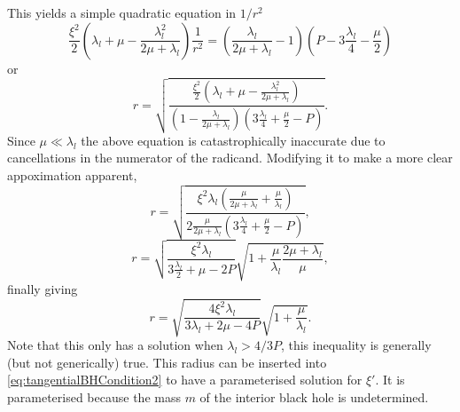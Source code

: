This yields a simple quadratic equation in $1/r^2$
\begin{equation}
\frac{\xi^2}{2}\left(\lambda_l + \mu - \frac{\lambda_l^2}{2\mu + \lambda_l}\right)\frac{1}{r^2} = \left(\frac{\lambda_l}{2\mu + \lambda_l} - 1\right)\left(P - 3\frac{\lambda_l}{4} - \frac{\mu}{2}\right)
\label{eq:quadraticBHRadius2}
\end{equation}
or
\begin{equation}
r = \sqrt{
\frac{\frac{\xi^2}{2}\left(\lambda_l + \mu - \frac{\lambda_l^2}{2\mu + \lambda_l}\right)}{\left(1 - \frac{\lambda_l}{2\mu + \lambda_l}\right)\left(3\frac{\lambda_l}{4} + \frac{\mu}{2} - P\right)}
}.
\label{eq:quadraticBHRadius2}
\end{equation}
Since $\mu\ll\lambda_l$ the above equation is catastrophically inaccurate due to cancellations in the numerator of the radicand. Modifying it to make a more clear appoximation apparent,
\begin{equation}
r = \sqrt{
\frac{\xi^2\lambda_l\left(\frac{\mu}{2\mu + \lambda_l} + \frac{\mu}{\lambda_l}\right)}{2\frac{\mu}{2\mu + \lambda_l}\left(3\frac{\lambda_l}{4} + \frac{\mu}{2} - P\right)}
},
\label{eq:quadraticBHRadius3}
\end{equation}
\begin{equation}
r = \sqrt{\frac{\xi^2\lambda_l}{3\frac{\lambda_l}{2} + \mu - 2P}}\sqrt{1 + \frac{\mu}{\lambda_l}\frac{2\mu + \lambda_l}{\mu}},
\label{eq:quadraticBHRadius4}
\end{equation}
finally giving
\begin{equation}
r = \sqrt{\frac{4\xi^2\lambda_l}{3\lambda_l + 2\mu - 4P}}\sqrt{1 + \frac{\mu}{\lambda_l}}.
\label{eq:quadraticBHRadius5}
\end{equation}
Note that this only has a solution when $\lambda_l > 4/3P$, this inequality is generally (but not generically) true. This radius can be inserted into \eqref{eq:tangentialBHCondition2} to have a parameterised solution for $\xi'$. It is parameterised because the mass $m$ of the interior black hole is undetermined.